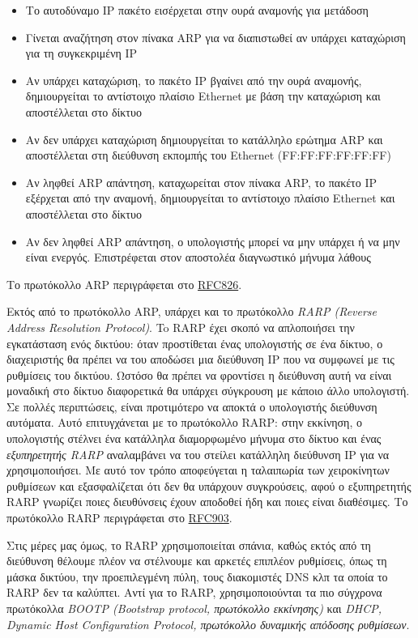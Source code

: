 \begin{itemize}
\item Το αυτοδύναμο IP πακέτο εισέρχεται στην ουρά αναμονής για μετάδοση
\item Γίνεται αναζήτηση στον πίνακα ARP για να διαπιστωθεί αν υπάρχει καταχώριση για τη συγκεκριμένη IP
\item Αν υπάρχει καταχώριση, το πακέτο IP βγαίνει από την ουρά αναμονής, δημιουργείται το αντίστοιχο πλαίσιο Ethernet με βάση την καταχώριση και αποστέλλεται στο δίκτυο
\item Αν δεν υπάρχει καταχώριση δημιουργείται το κατάλληλο ερώτημα ARP και αποστέλλεται στη διεύθυνση εκπομπής του Ethernet (FF:FF:FF:FF:FF:FF)
\item Αν ληφθεί ARP απάντηση, καταχωρείται στον πίνακα ARP, το πακέτο IP εξέρχεται από την αναμονή, δημιουργείται το αντίστοιχο πλαίσιο Ethernet και αποστέλλεται στο δίκτυο
\item Αν δεν ληφθεί ARP απάντηση, ο υπολογιστής μπορεί να μην υπάρχει ή να μην είναι ενεργός. Επιστρέφεται στον αποστολέα διαγνωστικό μήνυμα λάθους
\end{itemize}

Το πρωτόκολλο ARP περιγράφεται στο \href{https://www.ietf.org/rfc/rfc826.txt}{RFC826}.

Εκτός από το πρωτόκολλο ARP, υπάρχει και το πρωτόκολλο \emph{RARP (Reverse Address Resolution Protocol)}. To RARP έχει σκοπό να απλοποιήσει την εγκατάσταση ενός δικτύου: όταν προστίθεται ένας υπολογιστής σε ένα δίκτυο, ο διαχειριστής θα πρέπει να του αποδώσει μια διεύθυνση IP που να συμφωνεί με τις ρυθμίσεις του δικτύου. Ωστόσο θα πρέπει να φροντίσει η διεύθυνση αυτή να είναι μοναδική στο δίκτυο διαφορετικά θα υπάρχει σύγκρουση με κάποιο άλλο υπολογιστή. Σε πολλές περιπτώσεις, είναι προτιμότερο να αποκτά ο υπολογιστής διεύθυνση αυτόματα. Αυτό επιτυγχάνεται με το πρωτόκολλο RARP: στην εκκίνηση, ο υπολογιστής στέλνει ένα κατάλληλα διαμορφωμένο μήνυμα στο δίκτυο και ένας \emph{εξυπηρετητής RARP} αναλαμβάνει να του στείλει κατάλληλη διεύθυνση IP για να χρησιμοποιήσει. Με αυτό τον τρόπο αποφεύγεται η ταλαιπωρία των χειροκίνητων ρυθμίσεων και εξασφαλίζεται ότι δεν θα υπάρχουν συγκρούσεις, αφού ο εξυπηρετητής RARP γνωρίζει ποιες διευθύνσεις έχουν αποδοθεί ήδη και ποιες είναι διαθέσιμες. Το πρωτόκολλο RARP περιγράφεται στο \href{https://www.ietf.org/rfc/rfc903.txt}{RFC903}.

Στις μέρες μας όμως, το RARP χρησιμοποιείται σπάνια, καθώς εκτός από τη διεύθυνση θέλουμε πλέον να στέλνουμε και αρκετές επιπλέον ρυθμίσεις, όπως τη μάσκα δικτύου, την προεπιλεγμένη πύλη, τους διακομιστές DNS κλπ τα οποία το RARP δεν τα καλύπτει. Αντί για το RARP, χρησιμοποιούνται τα πιο σύγχρονα πρωτόκολλα \emph{BOOTP (Bootstrap protocol, πρωτόκολλο εκκίνησης)} και \emph{DHCP, Dynamic Host Configuration Protocol, πρωτόκολλο δυναμικής απόδοσης ρυθμίσεων}.


